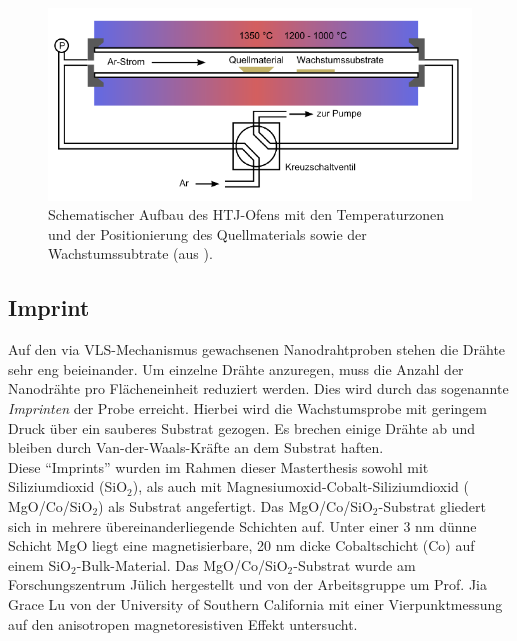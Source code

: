 \begin{figure}
\centering
\includegraphics[width=.75\textwidth]{Bilder/Methodik/htj}
\caption[Schematischer Aufbau des HTJ-Ofens]{Schematischer Aufbau des HTJ-Ofens mit den Temperaturzonen und der Positionierung des Quellmaterials sowie der Wachstumssubtrate (aus \cite{Thielmann.Dipl}).}
\label{htj}
\end{figure}
\subsection{Imprint}
Auf den via VLS-Mechanismus gewachsenen Nanodrahtproben stehen die Drähte sehr eng beieinander. Um einzelne Drähte anzuregen, muss die Anzahl der Nanodrähte pro Flächeneinheit reduziert werden. Dies wird durch das sogenannte \textit{Imprinten} der Probe erreicht. Hierbei wird die Wachstumsprobe mit geringem Druck über ein sauberes Substrat gezogen. Es brechen einige Drähte ab und bleiben durch Van-der-Waals-Kräfte an dem Substrat haften.\\
Diese ``Imprints'' wurden im Rahmen dieser Masterthesis sowohl mit Siliziumdioxid (SiO$_\text{2}$), als auch mit Magnesiumoxid-Cobalt-Siliziumdioxid ( MgO/Co/SiO$_\text{2}$) als Substrat angefertigt. Das MgO/Co/SiO$_\text{2}$-Substrat gliedert sich in mehrere übereinanderliegende Schichten auf. Unter einer 3 nm dünne Schicht MgO liegt eine  magnetisierbare, 20 nm dicke Cobaltschicht (Co) auf einem SiO$_2$-Bulk-Material. %
Das  MgO/Co/SiO$_\text{2}$-Substrat wurde am Forschungszentrum Jülich hergestellt und von der Arbeitsgruppe um Prof. Jia Grace Lu von der University of Southern California mit einer Vierpunktmessung auf den anisotropen magnetoresistiven Effekt untersucht.
